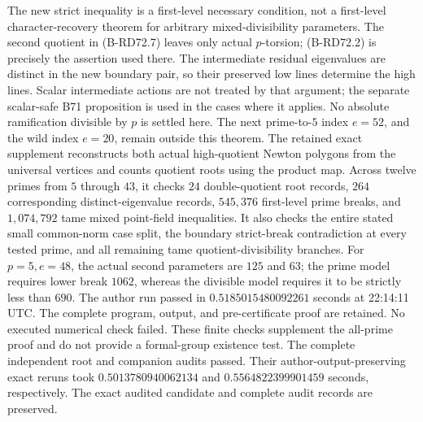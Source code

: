 \begin{remark}
\label{rem:B-RD72-scope}
The new strict inequality is a first-level necessary condition,
not a first-level character-recovery theorem for arbitrary
mixed-divisibility parameters. The second quotient in
(B-RD72.7) leaves only actual \(p\)-torsion; (B-RD72.2) is
precisely the assertion used there.
The intermediate residual eigenvalues are distinct in the new
boundary pair, so their preserved low lines determine the high
lines. Scalar intermediate actions are not treated by that
argument; the separate scalar-safe B71 proposition is used in
the cases where it applies.
No absolute ramification divisible by \(p\) is settled here.
The next prime-to-\(5\) index \(e=52\), and the wild index
\(e=20\), remain outside this theorem.
The retained exact supplement
reconstructs both actual high-quotient Newton polygons from the
universal vertices and counts quotient roots using the product map.
Across twelve primes from \(5\) through \(43\), it checks
\(24\) double-quotient root records, \(264\) corresponding
distinct-eigenvalue records, \(545{,}376\) first-level prime breaks,
and \(1{,}074{,}792\) tame mixed point-field inequalities.
It also checks the entire stated small common-norm case split,
the boundary strict-break contradiction at every tested prime,
and all remaining tame quotient-divisibility branches.
For \(p=5,e=48\), the actual second parameters are \(125\) and
\(63\); the prime model requires lower break \(1062\), whereas
the divisible model requires it to be strictly less than \(690\).
The author run passed in \(0.5185015480092261\) seconds at
22:14:11 UTC. The complete program, output, and pre-certificate
proof are retained. No executed numerical check failed.
These finite checks supplement the all-prime proof and do not
provide a formal-group existence test.
The complete independent root and companion audits passed.
Their author-output-preserving exact reruns took
\(0.5013780940062134\) and \(0.5564822399901459\) seconds,
respectively. The exact audited candidate and complete audit
records are preserved.
\end{remark}
